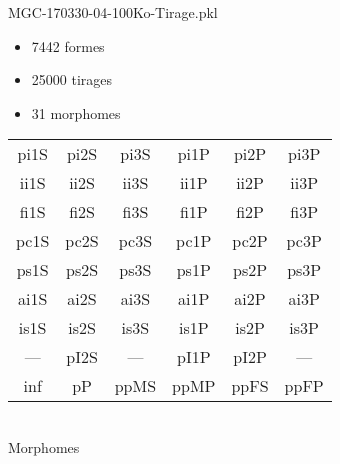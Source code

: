 MGC-170330-04-100Ko-Tirage.pkl
\begin{itemize}
\item 7442 formes
\item 25000 tirages
\item 31 morphomes
\end{itemize}
\begin{center}
\begin{tabular}{cccccc}
\hline
\cellcolor{white}pi1S & \cellcolor{orange}pi2S & \cellcolor{orange}pi3S & \cellcolor{white}pi1P & \cellcolor{white}pi2P & \cellcolor{white}pi3P\\
\cellcolor{brown}ii1S & \cellcolor{brown}ii2S & \cellcolor{brown}ii3S & \cellcolor{white}ii1P & \cellcolor{white}ii2P & \cellcolor{brown}ii3P\\
\cellcolor{yellow}fi1S & \cellcolor{lime}fi2S & \cellcolor{lime}fi3S & \cellcolor{green}fi1P & \cellcolor{white}fi2P & \cellcolor{green}fi3P\\
\cellcolor{yellow}pc1S & \cellcolor{yellow}pc2S & \cellcolor{yellow}pc3S & \cellcolor{white}pc1P & \cellcolor{white}pc2P & \cellcolor{yellow}pc3P\\
\cellcolor{teal}ps1S & \cellcolor{white}ps2S & \cellcolor{teal}ps3S & \cellcolor{white}ps1P & \cellcolor{white}ps2P & \cellcolor{teal}ps3P\\
\cellcolor{white}ai1S & \cellcolor{lightgray}ai2S & \cellcolor{lightgray}ai3S & \cellcolor{white}ai1P & \cellcolor{magenta}ai2P & \cellcolor{white}ai3P\\
\cellcolor{black}is1S & \cellcolor{black}is2S & \cellcolor{lightgray}is3S & \cellcolor{black}is1P & \cellcolor{black}is2P & \cellcolor{white}is3P\\
--- & \cellcolor{white}pI2S & --- & \cellcolor{white}pI1P & \cellcolor{white}pI2P & ---\\
\cellcolor{white}inf & \cellcolor{white}pP & \cellcolor{white}ppMS & \cellcolor{white}ppMP & \cellcolor{magenta}ppFS & \cellcolor{magenta}ppFP\\
\hline
\end{tabular}\\
Morphomes
\end{center}
\bigskip

